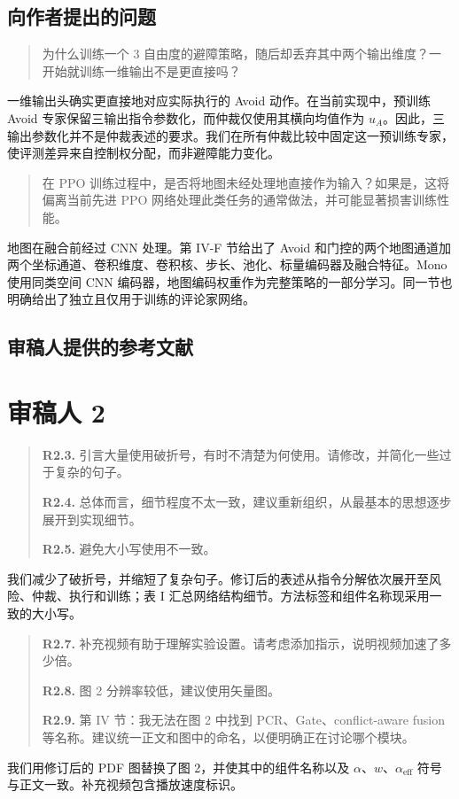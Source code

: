 \subsection*{向作者提出的问题}
\begin{quote}
为什么训练一个 3 自由度的避障策略，随后却丢弃其中两个输出维度？一开始就训练一维输出不是更直接吗？
\end{quote}
\response
一维输出头确实更直接地对应实际执行的 Avoid 动作。在当前实现中，预训练 Avoid 专家保留三输出指令参数化，而仲裁仅使用其横向均值作为 $u_A$。因此，三输出参数化并不是仲裁表述的要求。我们在所有仲裁比较中固定这一预训练专家，使评测差异来自控制权分配，而非避障能力变化。

\begin{quote}
在 PPO 训练过程中，是否将地图未经处理地直接作为输入？如果是，这将偏离当前先进 PPO 网络处理此类任务的通常做法，并可能显著损害训练性能。
\end{quote}
\response
地图在融合前经过 CNN 处理。第 IV-F 节给出了 Avoid 和门控的两个地图通道加两个坐标通道、卷积维度、卷积核、步长、池化、标量编码器及融合特征。Mono 使用同类空间 CNN 编码器，地图编码权重作为完整策略的一部分学习。同一节也明确给出了独立且仅用于训练的评论家网络。

\subsection*{审稿人提供的参考文献}


\section*{审稿人 2}
\begin{quote}
\textbf{R2.3.} 引言大量使用破折号，有时不清楚为何使用。请修改，并简化一些过于复杂的句子。

\textbf{R2.4.} 总体而言，细节程度不太一致，建议重新组织，从最基本的思想逐步展开到实现细节。

\textbf{R2.5.} 避免大小写使用不一致。
\end{quote}
\response
我们减少了破折号，并缩短了复杂句子。修订后的表述从指令分解依次展开至风险、仲裁、执行和训练；表 I 汇总网络结构细节。方法标签和组件名称现采用一致的大小写。

\begin{quote}
\textbf{R2.7.} 补充视频有助于理解实验设置。请考虑添加指示，说明视频加速了多少倍。

\textbf{R2.8.} 图 2 分辨率较低，建议使用矢量图。

\textbf{R2.9.} 第 IV 节：我无法在图 2 中找到 PCR、Gate、conflict-aware fusion 等名称。建议统一正文和图中的命名，以便明确正在讨论哪个模块。
\end{quote}
\response
我们用修订后的 PDF 图替换了图 2，并使其中的组件名称以及 $\alpha$、$w$、$\alpha_{\mathrm{eff}}$ 符号与正文一致。补充视频包含播放速度标识。


